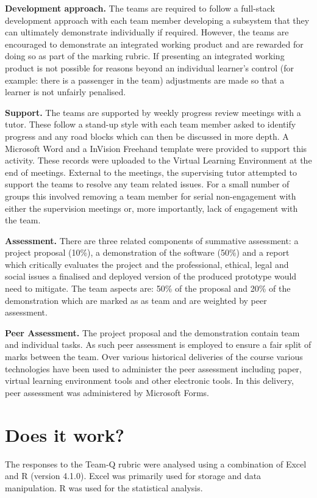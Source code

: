 \documentclass[sigconf, anonymous=true]{acmart}
\begin{document}
\textbf{Development approach.}
The teams are required to follow a full-stack development approach with each team member developing a subsystem that they can ultimately demonstrate individually if required. However, the teams are encouraged to demonstrate an integrated working product and are rewarded for doing so as part of the marking rubric. If presenting an integrated working product is not possible for reasons beyond an individual learner's control (for example: there is a passenger in the team) adjustments are made so that a learner is not unfairly penalised.

\textbf{Support.}
The teams are supported by weekly progress review meetings with a tutor. These  follow a stand-up style with each team member asked to identify progress and any road blocks which can then be discussed in more depth. A Microsoft Word and a InVision Freehand \cite{InVision} template were provided to support this activity. These records were uploaded to the Virtual Learning Environment at the end of meetings. External to the meetings, the supervising tutor attempted to support the teams to resolve any team related issues. For a small number of groups this involved removing a team member for serial non-engagement with either the supervision meetings or, more importantly, lack of engagement with the team.

\textbf{Assessment.}
There are three related components of summative assessment: a project proposal (10\%), a demonstration of the software (50\%) and a report which critically evaluates the project and the professional, ethical, legal and social issues a finalised and deployed version of the produced prototype would need to mitigate. The team aspects are: 50\% of the proposal and 20\% of the demonstration which are marked as as team and are weighted by peer assessment.

\textbf{Peer Assessment.}
The project proposal and the demonstration contain team and individual tasks. As such peer assessment is employed to ensure a fair split of marks between the team. Over various historical deliveries of the course various technologies have been used to administer the peer assessment including paper, virtual learning environment tools and other electronic tools. In this delivery, peer assessment was administered by Microsoft Forms. 
\section{Does it work?}	
The responses to the Team-Q rubric were analysed using a combination of Excel and R (version 4.1.0). Excel was primarily used for storage and data manipulation. R was used for the statistical analysis. 
\end{document}
